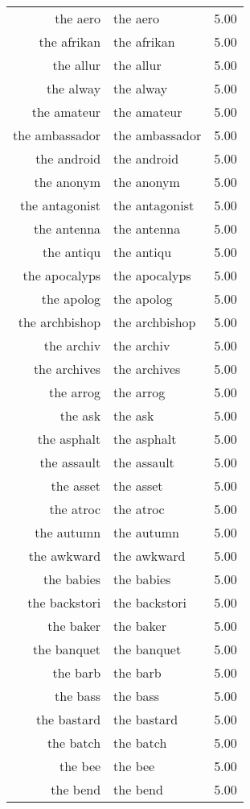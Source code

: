 \begin{table}[ht]
\begin{tabular}{rlr}
  the aero & the aero & 5.00 \\ 
  the afrikan & the afrikan & 5.00 \\ 
  the allur & the allur & 5.00 \\ 
  the alway & the alway & 5.00 \\ 
  the amateur & the amateur & 5.00 \\ 
  the ambassador & the ambassador & 5.00 \\ 
  the android & the android & 5.00 \\ 
  the anonym & the anonym & 5.00 \\ 
  the antagonist & the antagonist & 5.00 \\ 
  the antenna & the antenna & 5.00 \\ 
  the antiqu & the antiqu & 5.00 \\ 
  the apocalyps & the apocalyps & 5.00 \\ 
  the apolog & the apolog & 5.00 \\ 
  the archbishop & the archbishop & 5.00 \\ 
  the archiv & the archiv & 5.00 \\ 
  the archives & the archives & 5.00 \\ 
  the arrog & the arrog & 5.00 \\ 
  the ask & the ask & 5.00 \\ 
  the asphalt & the asphalt & 5.00 \\ 
  the assault & the assault & 5.00 \\ 
  the asset & the asset & 5.00 \\ 
  the atroc & the atroc & 5.00 \\ 
  the autumn & the autumn & 5.00 \\ 
  the awkward & the awkward & 5.00 \\ 
  the babies & the babies & 5.00 \\ 
  the backstori & the backstori & 5.00 \\ 
  the baker & the baker & 5.00 \\ 
  the banquet & the banquet & 5.00 \\ 
  the barb & the barb & 5.00 \\ 
  the bass & the bass & 5.00 \\ 
  the bastard & the bastard & 5.00 \\ 
  the batch & the batch & 5.00 \\ 
  the bee & the bee & 5.00 \\ 
  the bend & the bend & 5.00 \\ 

\end{tabular}
\end{table}
